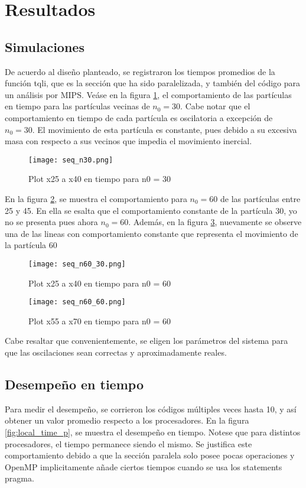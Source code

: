 \section{Resultados}

\subsection{Simulaciones}
De acuerdo al diseño planteado, se registraron los tiempos promedios de la función tqli, que es la sección que ha sido paralelizada, y también del código para un análisis por MIPS. Veáse en la figura \ref{fig:seq_n30}, el comportamiento de las partículas en tiempo para las partículas vecinas de $n_0 = 30$. Cabe notar que el comportamiento en tiempo de cada partícula es oscilatoria a excepción de $n_0 = 30$. El movimiento de esta partícula es constante, pues debido a su excesiva masa con respecto a sus vecinos que impedia el movimiento inercial.

\begin{figure}[h]
	\centering
	\texttt{[image: seq\_n30.png]}
	\caption{Plot x25 a x40 en tiempo para n0 = 30} 
	\label{fig:seq_n30}
\end{figure}

En la figura \ref{fig:seq_n60_30}, se muestra el comportamiento para $n_0 = 60$ de las partículas entre 25 y 45. En ella se esalta que el comportamiento constante de la partícula $30$, yo no se presenta pues ahora $n_0 = 60$. Además, en la figura \ref{fig:seq_n60_60}, nuevamente se observe una de las lineas con comportamiento constante que representa el movimiento de la partícula $60$

\begin{figure}[h]
	\centering
	\texttt{[image: seq\_n60\_30.png]}
	\caption{Plot x25 a x40 en tiempo para n0 = 60}
	\label{fig:seq_n60_30}
\end{figure}

\begin{figure}[h]
	\centering
	\texttt{[image: seq\_n60\_60.png]}
	\caption{Plot x55 a x70 en tiempo para n0 = 60}
	\label{fig:seq_n60_60}
\end{figure}

Cabe resaltar que convenientemente, se eligen los parámetros del sistema para que las oscilaciones sean correctas y aproximadamente reales.

\subsection{Desempeño en tiempo}
Para medir el desempeño, se corrieron los códigos múltiples veces hasta 10, y así obtener un valor promedio respecto a los procesadores.
En la figura \ref{fig:local_time_p}, se muestra el desempeño en tiempo. Notese que para distintos procesadores, el tiempo permanece siendo el mismo. Se justifica este comportamiento debido a que la sección paralela solo posee pocas operaciones y OpenMP implicitamente añade ciertos tiempos cuando se usa los statements pragma.

